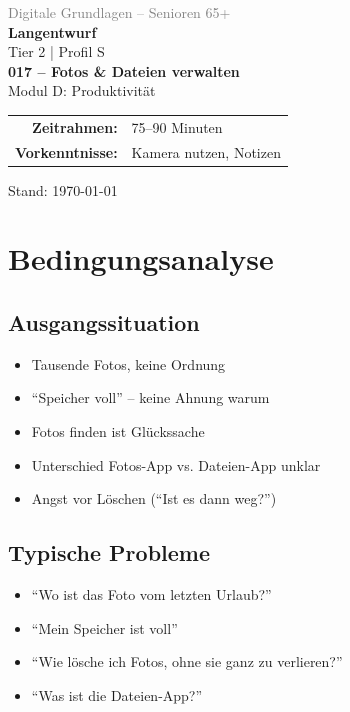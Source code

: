\documentclass[11pt,a4paper]{article}
\begin{document}
\begin{titlepage}
    \centering
    \vspace*{2cm}
    {\Large\textcolor{gray}{Digitale Grundlagen -- Senioren 65+}}\\[2cm]
    {\Huge\textcolor{fach}{\textbf{Langentwurf}}}\\[0.5cm]
    {\large Tier 2 | Profil S}\\[2cm]
    {\LARGE\textbf{017 -- Fotos \& Dateien verwalten}}\\[0.5cm]
    {\large Modul D: Produktivität}\\[2cm]
    \begin{tabular}{rl}
        \textbf{Zeitrahmen:} & 75--90 Minuten \\
        \textbf{Vorkenntnisse:} & Kamera nutzen, Notizen \\
    \end{tabular}
    \vfill
    {\normalsize Stand: \today}
\end{titlepage}

\tableofcontents
\newpage

\section{Bedingungsanalyse}

\subsection{Ausgangssituation}
\begin{itemize}
    \item Tausende Fotos, keine Ordnung
    \item ``Speicher voll'' -- keine Ahnung warum
    \item Fotos finden ist Glückssache
    \item Unterschied Fotos-App vs. Dateien-App unklar
    \item Angst vor Löschen (``Ist es dann weg?'')
\end{itemize}

\subsection{Typische Probleme}
\begin{itemize}
    \item ``Wo ist das Foto vom letzten Urlaub?''
    \item ``Mein Speicher ist voll''
    \item ``Wie lösche ich Fotos, ohne sie ganz zu verlieren?''
    \item ``Was ist die Dateien-App?''
\end{itemize}
\end{document}
